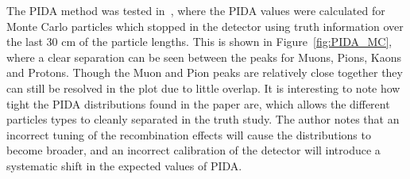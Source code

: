 The PIDA method was tested in~\citep{PIDA_Paper}, where the PIDA values were calculated for Monte Carlo particles which stopped in the detector using truth information over the last 30 cm of the particle lengths. This is shown in Figure~\ref{fig:PIDA_MC}, where a clear separation can be seen between the peaks for Muons, Pions, Kaons and Protons. Though the Muon and Pion peaks are relatively close together they can still be resolved in the plot due to little overlap. It is interesting to note how tight the PIDA distributions found in the paper are, which allows the different particles types to cleanly separated in the truth study. The author notes that an incorrect tuning of the recombination effects will cause the distributions to become broader, and an incorrect calibration of the detector will introduce a systematic shift in the expected values of PIDA. \\

